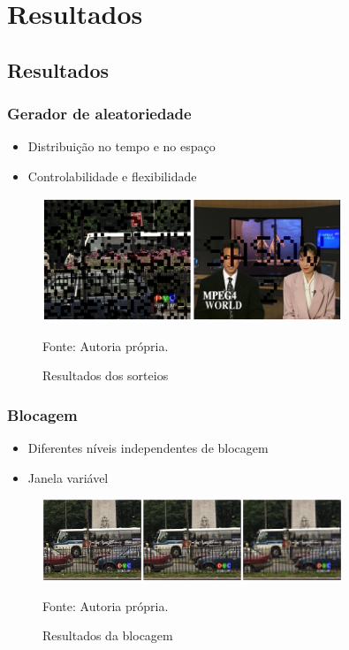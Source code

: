 \section{Resultados}

\subsection{Resultados}
	\begin{frame}\frametitle{Gerador de aleatoriedade}
		\begin{itemize}
			\item Distribuição no tempo e no espaço
			\item Controlabilidade e flexibilidade
		\end{itemize}

		\begin{figure}
			\includegraphics[width=0.8\textwidth]{./imgs/raffle.png}
			\caption{Resultados dos sorteios}
			\tiny
			Fonte: Autoria própria.
		\end{figure}
    \end{frame}

    \begin{frame}\frametitle{Blocagem}
		\begin{itemize}
			\item Diferentes níveis independentes de blocagem
			\item Janela variável
		\end{itemize}

		\begin{figure}
			\includegraphics[width=0.8\textwidth]{./imgs/block.png}
			\caption{Resultados da blocagem}
			\tiny
			Fonte: Autoria própria.
		\end{figure}

    \end{frame}
	
